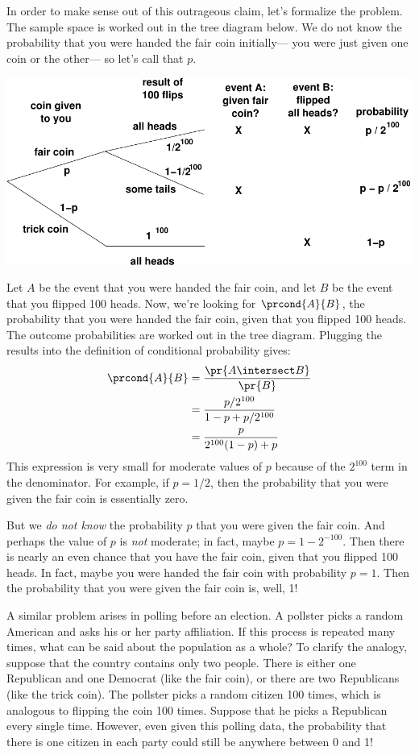 In order to make sense out of this outrageous claim, let's formalize
the problem.  The sample space is worked out in the tree diagram
below.  We do not know the probability that you were handed the fair
coin initially--- you were just given one coin or the other--- so
let's call that $p$.
%
\begin{center}
\includegraphics{figures/trick-coin}
\end{center}
%
Let $A$ be the event that you were handed the fair coin, and let $B$
be the event that you flipped 100 heads.  Now, we're looking for
$\prcond{A}{B}$, the probability that you were handed the fair coin,
given that you flipped 100 heads.  The outcome probabilities are
worked out in the tree diagram.  Plugging the results into the
definition of conditional probability gives:
%
\begin{align*}
\prcond{A}{B}	& = \frac{\pr{A \intersect B}}{\pr{B}} \\
		& = \frac{p / 2^{100}}{1 - p + p / 2^{100}} \\
		& = \frac{p}{2^{100} (1 - p) + p}
\end{align*}
%
This expression is very small for moderate values of $p$ because of
the $2^{100}$ term in the denominator.  For example, if $p = 1/2$,
then the probability that you were given the fair coin is essentially
zero.

But we \textit{do not know} the probability $p$ that you were given
the fair coin.  And perhaps the value of $p$ is \textit{not} moderate;
in fact, maybe $p = 1 - 2^{-100}$.  Then there is nearly an even
chance that you have the fair coin, given that you flipped 100 heads.
In fact, maybe you were handed the fair coin with probability $p = 1$.
Then the probability that you were given the fair coin is, well, 1!

A similar problem arises in polling before an election.  A pollster
picks a random American and asks his or her party affiliation.  If
this process is repeated many times, what can be said about the
population as a whole?  To clarify the analogy, suppose that the
country contains only two people.  There is either one Republican and
one Democrat (like the fair coin), or there are two Republicans (like
the trick coin).  The pollster picks a random citizen 100 times, which
is analogous to flipping the coin 100 times.  Suppose that he picks a
Republican every single time.  However, even given this
polling data, the probability that there is one citizen in each party
could still be anywhere between 0 and 1!

